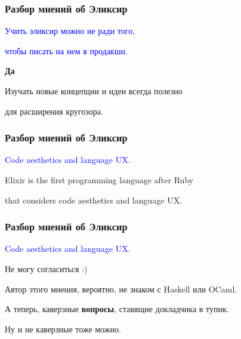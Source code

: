 \documentclass[10pt]{beamer}
\begin{document}
\begin{frame}
\frametitle{Разбор мнений об Эликсир}
\centering
\textcolor{blue}{Учить эликсир можно не ради того,}
\par
\textcolor{blue}{чтобы писать на нем в продакшн.}
\par \bigskip
\textbf{Да}
\par \bigskip
Изучать новые концепции и идеи всегда полезно
\par
для расширения кругозора.
\end{frame}






\begin{frame}
\frametitle{Разбор мнений об Эликсир}
\centering
\textcolor{blue}{Code aesthetics and language UX.}
\par \bigskip
Elixir is the first programming language after Ruby
\par \bigskip
that considers code aesthetics and language UX.
\end{frame}


\begin{frame}
\frametitle{Разбор мнений об Эликсир}
\centering
\textcolor{blue}{Code aesthetics and language UX.}
\par \bigskip
Не могу согласиться :)
\par \bigskip
Автор этого мнения, вероятно, не знаком с Haskell или OCaml.
\end{frame}



{
\begin{frame}
\centering
А теперь, каверзные \textbf{вопросы}, ставящие докладчика в тупик.
\par \bigskip
Ну и не каверзные тоже можно.
\end{frame}
}
\end{document}
